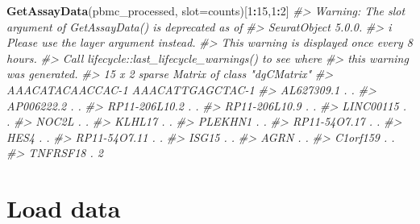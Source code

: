 \documentclass[
]{book}
\newenvironment{Shaded}{\begin{snugshade}}{\end{snugshade}}
\newcommand{\AttributeTok}[1]{\textcolor[rgb]{0.13,0.29,0.53}{#1}}
\newcommand{\CommentTok}[1]{\textcolor[rgb]{0.56,0.35,0.01}{\textit{#1}}}
\newcommand{\DecValTok}[1]{\textcolor[rgb]{0.00,0.00,0.81}{#1}}
\newcommand{\FunctionTok}[1]{\textcolor[rgb]{0.13,0.29,0.53}{\textbf{#1}}}
\newcommand{\NormalTok}[1]{#1}
\newcommand{\SpecialCharTok}[1]{\textcolor[rgb]{0.81,0.36,0.00}{\textbf{#1}}}
\newcommand{\StringTok}[1]{\textcolor[rgb]{0.31,0.60,0.02}{#1}}
\begin{document}
\begin{Shaded}
\begin{Highlighting}[]
\FunctionTok{GetAssayData}\NormalTok{(pbmc\_processed, }\AttributeTok{slot=}\StringTok{\textquotesingle{}counts\textquotesingle{}}\NormalTok{)[}\DecValTok{1}\SpecialCharTok{:}\DecValTok{15}\NormalTok{,}\DecValTok{1}\SpecialCharTok{:}\DecValTok{2}\NormalTok{]}
\CommentTok{\#\textgreater{} Warning: The \textasciigrave{}slot\textasciigrave{} argument of \textasciigrave{}GetAssayData()\textasciigrave{} is deprecated as of}
\CommentTok{\#\textgreater{} SeuratObject 5.0.0.}
\CommentTok{\#\textgreater{} i Please use the \textasciigrave{}layer\textasciigrave{} argument instead.}
\CommentTok{\#\textgreater{} This warning is displayed once every 8 hours.}
\CommentTok{\#\textgreater{} Call \textasciigrave{}lifecycle::last\_lifecycle\_warnings()\textasciigrave{} to see where}
\CommentTok{\#\textgreater{} this warning was generated.}
\CommentTok{\#\textgreater{} 15 x 2 sparse Matrix of class "dgCMatrix"}
\CommentTok{\#\textgreater{}               AAACATACAACCAC{-}1 AAACATTGAGCTAC{-}1}
\CommentTok{\#\textgreater{} AL627309.1                   .                .}
\CommentTok{\#\textgreater{} AP006222.2                   .                .}
\CommentTok{\#\textgreater{} RP11{-}206L10.2                .                .}
\CommentTok{\#\textgreater{} RP11{-}206L10.9                .                .}
\CommentTok{\#\textgreater{} LINC00115                    .                .}
\CommentTok{\#\textgreater{} NOC2L                        .                .}
\CommentTok{\#\textgreater{} KLHL17                       .                .}
\CommentTok{\#\textgreater{} PLEKHN1                      .                .}
\CommentTok{\#\textgreater{} RP11{-}54O7.17                 .                .}
\CommentTok{\#\textgreater{} HES4                         .                .}
\CommentTok{\#\textgreater{} RP11{-}54O7.11                 .                .}
\CommentTok{\#\textgreater{} ISG15                        .                .}
\CommentTok{\#\textgreater{} AGRN                         .                .}
\CommentTok{\#\textgreater{} C1orf159                     .                .}
\CommentTok{\#\textgreater{} TNFRSF18                     .                2}
\end{Highlighting}
\end{Shaded}

\chapter{Load data}\label{load}
\end{document}
